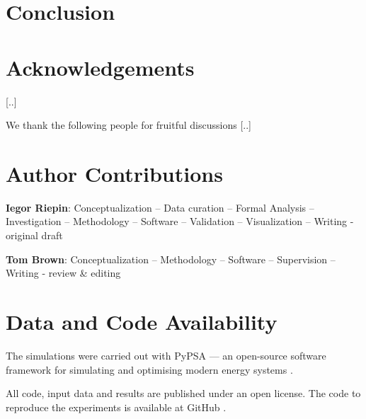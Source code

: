 \documentclass[11pt, 5p, nopreprintline]{elsarticle}
\begin{document}
\section{Conclusion}
\label{sec:conclusion}


\section*{Acknowledgements}

[..]

We thank the following people for fruitful discussions [..]

\section*{Author Contributions}


\textbf{Iegor Riepin}:
Conceptualization --
Data curation --
Formal Analysis --
Investigation --
Methodology --
Software --
Validation --
Visualization --
Writing - original draft

\textbf{Tom Brown}:
Conceptualization --
Methodology --
Software --
Supervision --
Writing - review \& editing

\section*{Data and Code Availability}
\label{sec:code}

The simulations were carried out with PyPSA --- an open-source software framework for simulating and optimising modern energy systems \cite{brownPyPSAPythonPower2018}.

All code, input data and results are published under an open license. The code to reproduce the experiments is available at GitHub \cite{github-spacetime}.

\printglossary[type=\acronymtype]

\renewcommand{\ttdefault}{\sfdefault}



\newpage

\makeatletter
\renewcommand \thesection{S\@arabic\c@section}
\renewcommand\thetable{S\@arabic\c@table}
\renewcommand \thefigure{S\@arabic\c@figure}
\makeatother
\renewcommand{\citenumfont}[1]{S#1}
\setcounter{equation}{0}
\setcounter{figure}{0}
\setcounter{table}{0}
\setcounter{section}{0}
\end{document}
